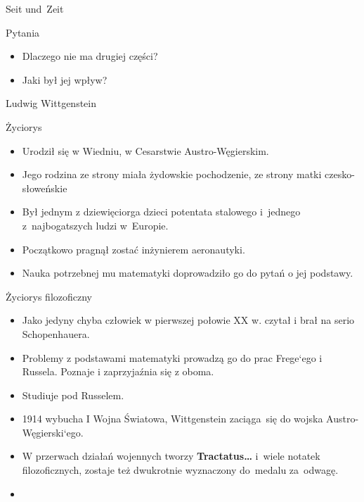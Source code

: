 \documentclass{beamer}  %
\begin{document}
\begin{frame}{Seit und~Zeit}

  \begin{block}{Pytania}
    \begin{itemize}
      \pause
    \item Dlaczego nie ma drugiej części? \pause
    \item Jaki był jej wpływ?
    \end{itemize}
  \end{block}

\end{frame}



\begin{frame}{Ludwig Wittgenstein}

  \begin{block}{Życiorys}
    \begin{itemize}
    \item Urodził się w Wiedniu, w Cesarstwie Austro-Węgierskim.
    \item Jego rodzina ze strony miała żydowskie pochodzenie, ze
      strony matki czesko-słoweńskie
    \item Był jednym z dziewięciorga dzieci potentata stalowego
      i~jednego z~najbogatszych ludzi w~Europie.
    \item Początkowo pragnął zostać inżynierem aeronautyki.
    \item Nauka potrzebnej mu matematyki doprowadziło go do pytań o
      jej podstawy.
    \end{itemize}
  \end{block}

\end{frame}



\begin{frame}
  \begin{block}{Życiorys filozoficzny}
    \begin{itemize}
      \pause
    \item Jako jedyny chyba człowiek w pierwszej połowie XX w. czytał
      i brał na serio Schopenhauera.
    \item Problemy z podstawami matematyki prowadzą go do prac
      Frege`ego i Russela. Poznaje i zaprzyjaźnia się z oboma. \pause
    \item Studiuje pod Russelem. \pause
    \item 1914 wybucha I Wojna Światowa, Wittgenstein zaciąga~się do
      wojska Austro-Węgierski`ego. \pause
    \item W przerwach działań wojennych tworzy
      \textbf{Tractatus\ldots} i~wiele notatek filozoficznych, zostaje
      też dwukrotnie wyznaczony do~medalu za~odwagę.
    \item
    \end{itemize}
  \end{block}

\end{frame}
\end{document}
